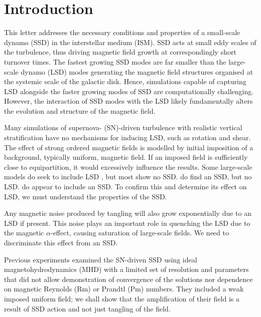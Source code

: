 \documentclass[preprint2]{aastex63}
\begin{document}
\section{Introduction}\label{sec:intro}


 This letter addresses the necessary conditions and properties of a small-scale
 dynamo (SSD) in the interstellar medium (ISM).
 SSD acts at small eddy scales of the turbulence, thus driving magnetic field
 growth at correspondingly short turnover times.
 The fastest growing SSD modes are far smaller than the large-scale dynamo
 (LSD) modes generating the magnetic field structures organised at the systemic
 scale of the galactic disk.
 Hence, simulations capable of capturing LSD alongside the faster growing modes
 of SSD are computationally challenging.
 However, the interaction of SSD modes with the LSD likely fundamentally alters
 the evolution and structure of the magnetic field.

 Many simulations of supernova- (SN)-driven turbulence with realistic vertical
 stratification \citep[e.g.,][]{deAvillez:2005,PO07,Hill:2012a,HI14} have no
 mechanisms for inducing LSD, such as rotation and shear.
 The effect of strong ordered magnetic fields is modelled by initial
 imposition of a background, typically uniform, magnetic field.
 If an imposed field is sufficiently close to equipartition, it
 would excessively influence the results.
 Some large-scale models do seek to include LSD \citep[e.g.,][]{Korpi:1999b,
 Gressel:2008,HWK09,WA09,Pakmor17,SBADMN19,GE20}, but most show no SSD.
 \citet{SBADMN19} do find an SSD, but no LSD.
 \citet{Gent:2013b,EGSFB16} do appear to include an SSD.
 To confirm this and determine its effect on LSD, we must understand the
 properties of the SSD.
     
 Any magnetic noise produced by tangling will also grow exponentially due to
 an LSD if present.
 This noise plays an important role in quenching the LSD due to the magnetic
 $\alpha$-effect, causing saturation of large-scale fields.
 We need to discriminate this effect from an SSD.   

 Previous experiments \citep[e.g.,][]{BKMM04,BalKim05,MacLow:2005}
 examined the SN-driven SSD using ideal magnetohydrodynamics (MHD) with
 a limited set of resolution and parameters that did not allow
 demonstration of convergence of the solutions nor dependence on
 magnetic Reynolds (Rm) or Prandtl (Pm) numbers.
 They included a weak imposed uniform field; we shall show
 that the amplification of their field is a result
 of SSD action and not just tangling of the field.
\end{document}
